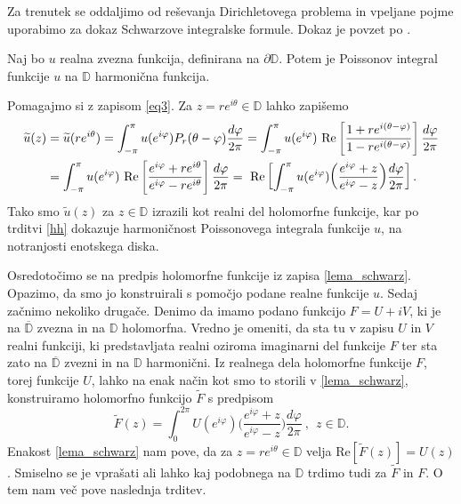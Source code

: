 \documentclass[mat1, tisk]{fmfdelo}
\begin{document}
    Za trenutek se oddaljimo od reševanja Dirichletovega problema in vpeljane pojme uporabimo za dokaz Schwarzove integralske formule. Dokaz je povzet po \cite[stran 6]{agarwal}.

     \begin{lema}
        \label{realnidel}
        Naj bo $u$ realna zvezna funkcija, definirana na $\partial \mathbb{D}$. Potem je Poissonov integral funkcije $u$ na $\mathbb{D}$ harmonična funkcija.
     \end{lema}
     \begin{dokaz}
        Pomagajmo si z zapisom \eqref{eq3}. Za $z = re^{i\theta} \in \mathbb{D}$ lahko zapišemo
            \begin{align}
                \label{lema_schwarz}
                \widetilde{u}(z) &= \widetilde{u}(r e^{i \theta}) = \int_{-\pi}^{\pi}{u(e^{i \varphi}) P_r(\theta - \varphi)\frac{d \varphi}{2 \pi}} = \int_{-\pi}^{\pi}{u(e^{i \varphi})~\text{Re}\left[\frac{1+re^{i(\theta - \varphi)}}{1-re^{i(\theta - \varphi)}}\right]\frac{d \varphi}{2 \pi}} \notag \\
                &= \int_{-\pi}^{\pi}{u(e^{i \varphi})~\text{Re}\left[\frac{e^{i\varphi}+re^{i\theta}}{e^{i\varphi}-re^{i\theta}}\right]\frac{d \varphi}{2 \pi}}=~\text{Re}\left[\int_{-\pi}^{\pi}{u(e^{i \varphi})\bigg(\frac{e^{i\varphi}+z}{e^{i\varphi}-z}\bigg)\frac{d \varphi}{2 \pi}}\right].
            \end{align}
        Tako smo $\widetilde{u}(z)$ za $z \in \mathbb{D}$ izrazili kot realni del holomorfne funkcije, kar po trditvi \ref{hh} dokazuje harmoničnost Poissonovega integrala funkcije $u$, na notranjosti enotskega diska.
     \end{dokaz}

     Osredotočimo se na predpis holomorfne funkcije iz zapisa \eqref{lema_schwarz}. Opazimo, da smo jo konstruirali s pomočjo podane realne funkcije $u$. 
     Sedaj začnimo nekoliko drugače. Denimo da imamo podano funkcijo $F = U + iV$, ki je na $\overline{\mathbb{D}}$ zvezna in na $\mathbb{D}$ holomorfna. Vredno je omeniti, da sta tu v zapisu $U$ in $V$ realni funkciji, ki predstavljata realni oziroma imaginarni del funkcije $F$ ter sta zato na $\overline{\mathbb{D}}$ zvezni in na $\mathbb{D}$ harmonični.
     Iz realnega dela holomorfne funkcije $F$, torej funkcije $U$, lahko na enak način kot smo to storili v \eqref{lema_schwarz}, konstruiramo holomorfno funkcijo $\widetilde{F}$ s predpisom
     \begin{equation}
        \label{priprav_schwarz}
        \widetilde{F}(z) = \int_{0}^{2 \pi}{U(e^{i \varphi})\bigg(\frac{e^{i\varphi}+z}{e^{i\varphi}-z}\bigg)\frac{d \varphi}{2 \pi}}~,~~z \in \mathbb{D}.
    \end{equation}
    Enakost \eqref{lema_schwarz} nam pove, da za $z = r e^{i\theta}\in \mathbb{D}$ velja $\text{Re}[\widetilde{F}(z)] = U(z)$. Smiselno se je vprašati ali lahko kaj podobnega na $\mathbb{D}$ trdimo tudi za $\widetilde{F}$ in $F$. 
    O tem nam več pove naslednja trditev. 
\end{document}
